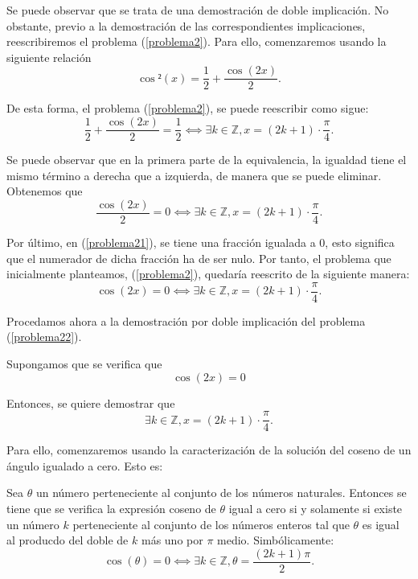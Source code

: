 \begin{demostracion}
  Se puede observar que se trata de una demostración de doble
  implicación. No obstante, previo a la demostración de las
  correspondientes implicaciones, reescribiremos el problema
  (\ref{problema2}). Para ello, comenzaremos usando la siguiente
  relación
  \begin{equation}
    \cos²(x) = \frac{1}{2} + \frac{\cos(2x)}{2}.
  \end{equation}

  De esta forma, el problema (\ref{problema2}), se puede reescribir como
  sigue:
  \begin{equation}
    \frac{1}{2} + \frac{\cos(2x)}{2} = \frac{1}{2} ⟺
    ∃ k ∈ ℤ, x = (2k + 1) ⋅ \frac{π}{4}.
  \end{equation}

  Se puede observar que en la primera parte de la equivalencia, la
  igualdad tiene el mismo término a derecha que a izquierda, de manera
  que se puede eliminar. Obtenemos que
  \begin{equation}\label{problema21}
    \frac{\cos(2x)}{2} = 0 ⟺ ∃ k ∈ ℤ, x = (2k+1) ⋅ \frac{π}{4}.
  \end{equation}

  Por último, en (\ref{problema21}), se tiene una fracción igualada a 0,
  esto significa que el numerador de dicha fracción ha de ser nulo. Por
  tanto, el problema que inicialmente planteamos, (\ref{problema2}),
  quedaría reescrito de la siguiente manera:
  \begin{equation}\label{problema22}
    \cos(2x) = 0  ⟺ ∃ k ∈ ℤ, x = (2k+1) ⋅ \frac{π}{4}.
  \end{equation}

  Procedamos ahora a la demostración por doble implicación del
  problema (\ref{problema22}).

  \noindent
  \framebox{\longrightarrow} Supongamos que se verifica que
  \begin{equation}\label{Dobleh2}\tag{h1}
    \cos(2x) = 0
  \end{equation}

  Entonces, se quiere demostrar que
  \begin{equation}\label{ConcDoble}
    ∃ k ∈ ℤ, x = (2k+1) ⋅ \frac{π}{4}.
  \end{equation}

  Para ello, comenzaremos usando la caracterización de la solución del
  coseno de un ángulo igualado a cero. Esto es:

  \begin{proposicion}\label{alpha}
    Sea \(θ\) un número perteneciente al conjunto de los
    números naturales. Entonces se tiene que se verifica la
    expresión coseno de \(θ\) igual a cero si y solamente si
    existe un número \(k\) perteneciente al conjunto de los
    números enteros tal que \(θ\) es igual al producdo del
    doble de \(k\) más uno por \(π\) medio. Simbólicamente:
  \begin{equation}\label{alpha2}
    \cos(θ) = 0 ⟺ ∃ k ∈ ℤ,  θ = \frac{(2k+1)π}{2}.
  \end{equation}
  \end{proposicion}


\end{demostracion}
